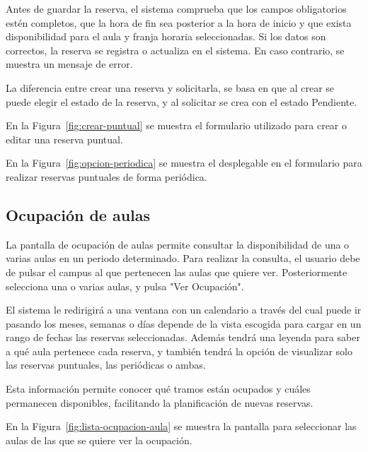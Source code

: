 Antes de guardar la reserva, el sistema comprueba que los campos obligatorios estén completos, que la hora de fin sea posterior a la hora de inicio y que exista disponibilidad para el aula y franja horaria seleccionadas. Si los datos son correctos, la reserva se registra o actualiza en el sistema. En caso contrario, se muestra un mensaje de error.

La diferencia entre crear una reserva y solicitarla, se basa en que al crear se puede elegir el estado de la reserva, y al solicitar se crea con el estado Pendiente.

En la Figura~\ref{fig:crear-puntual} se muestra el formulario utilizado para crear o editar una reserva puntual.


En la Figura~\ref{fig:opcion-periodica} se muestra el desplegable en el formulario para realizar reservas puntuales de forma periódica.


\subsection{Ocupación de aulas}

La pantalla de ocupación de aulas permite consultar la disponibilidad de una o varias aulas en un periodo determinado. Para realizar la consulta, el usuario debe de pulsar el campus al que pertenecen las aulas que quiere ver. Posteriormente selecciona una o varias aulas, y pulsa "Ver Ocupación".

El sistema le redirigirá a una ventana con un calendario a través del cual puede ir pasando los meses, semanas o días depende de la vista escogida para cargar en un rango de fechas las reservas seleccionadas. Además tendrá una leyenda para saber a qué aula pertenece cada reserva, y también tendrá la opción de visualizar solo las reservas puntuales, las periódicas o ambas.

Esta información permite conocer qué tramos están ocupados y cuáles permanecen disponibles, facilitando la planificación de nuevas reservas.

En la Figura~\ref{fig:lista-ocupacion-aula} se muestra la pantalla para seleccionar las aulas de las que se quiere ver la ocupación.


